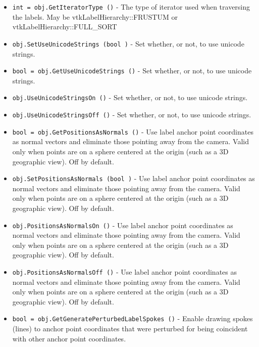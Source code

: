 \begin{itemize}
\item  \verb|int = obj.GetIteratorType ()| -  The type of iterator used when traversing the labels.
 May be vtkLabelHierarchy::FRUSTUM or vtkLabelHierarchy::FULL\_SORT

\item  \verb|obj.SetUseUnicodeStrings (bool )| -  Set whether, or not, to use unicode strings.

\item  \verb|bool = obj.GetUseUnicodeStrings ()| -  Set whether, or not, to use unicode strings.

\item  \verb|obj.UseUnicodeStringsOn ()| -  Set whether, or not, to use unicode strings.

\item  \verb|obj.UseUnicodeStringsOff ()| -  Set whether, or not, to use unicode strings.

\item  \verb|bool = obj.GetPositionsAsNormals ()| -  Use label anchor point coordinates as normal vectors and eliminate those
 pointing away from the camera. Valid only when points are on a sphere
 centered at the origin (such as a 3D geographic view). Off by default.

\item  \verb|obj.SetPositionsAsNormals (bool )| -  Use label anchor point coordinates as normal vectors and eliminate those
 pointing away from the camera. Valid only when points are on a sphere
 centered at the origin (such as a 3D geographic view). Off by default.

\item  \verb|obj.PositionsAsNormalsOn ()| -  Use label anchor point coordinates as normal vectors and eliminate those
 pointing away from the camera. Valid only when points are on a sphere
 centered at the origin (such as a 3D geographic view). Off by default.

\item  \verb|obj.PositionsAsNormalsOff ()| -  Use label anchor point coordinates as normal vectors and eliminate those
 pointing away from the camera. Valid only when points are on a sphere
 centered at the origin (such as a 3D geographic view). Off by default.

\item  \verb|bool = obj.GetGeneratePerturbedLabelSpokes ()| -  Enable drawing spokes (lines) to anchor point coordinates that were perturbed
 for being coincident with other anchor point coordinates.


\end{itemize}
